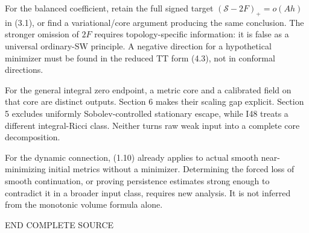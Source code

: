 \documentclass[
  10pt,
]{article}
\begin{document}
For the balanced coefficient, retain the full signed target
\((\mathscr S-2F)_+=o(Ah)\) in (3.1), or find a variational/core
argument producing the same conclusion. The stronger omission of \(2F\)
requires topology-specific information: it is false as a universal
ordinary-SW principle. A negative direction for a hypothetical minimizer
must be found in the reduced TT form (4.3), not in conformal directions.

For the general integral zero endpoint, a metric core and a calibrated
field on that core are distinct outputs. Section 6 makes their scaling
gap explicit. Section 5 excludes uniformly Sobolev-controlled stationary
escape, while I48 treats a different integral-Ricci class. Neither turns
raw weak input into a complete core decomposition.

For the dynamic connection, (1.10) already applies to actual smooth
near-minimizing initial metrics without a minimizer. Determining the
forced loss of smooth continuation, or proving persistence estimates
strong enough to contradict it in a broader input class, requires new
analysis. It is not inferred from the monotonic volume formula alone.

END COMPLETE SOURCE
\end{document}
